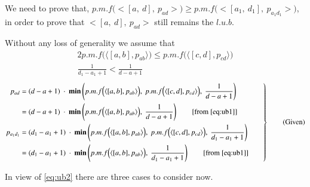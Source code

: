 \documentclass[final,3p, review, times]{Elsevier/elsarticle}
\begin{document}
We need to prove that, $p.m.f\Big(\big<[a,\ d],\ p_{ad}\big>\Big)\geq p.m.f\Big(\big<[a_1,\ d_1],\ p_{a_1d_1}\big>\Big)$, in order to prove that $\big<[a,\ d],\ p_{ad}\big>$ still remains the $l.u.b$.

Without any loss of generality we assume that
\begin{alignat}{2}
p.m.f\Big(\langle[a,b],p_{ab}\rangle\Big)\leq p.m.f\Big(\langle[c,d],p_{cd}\rangle\Big)\label{eq:ub1}\\
\frac{1}{d_1-a_1+1}<\frac{1}{d-a+1}\label{eq:ub2}
\end{alignat}
\begin{equation*}
 \left.\begin{aligned}
        p_{ad}&=(d-a+1)\ \cdot\ \mathbf{min}\left(p.m.f\Big(\langle[a,b],p_{ab}\rangle\Big),\ p.m.f\Big(\langle[c,d],p_{cd}\rangle\Big),\ \frac{1}{d-a+1}\right)\\
        &=(d-a+1)\ \cdot\ \mathbf{min}\left(p.m.f\Big(\langle[a,b],p_{ab}\rangle\Big),\ \frac{1}{d-a+1}\right)\qquad[\mathrm{from}\ \ref{eq:ub1}]\\
        p_{a_1d_1}&=(d_1-a_1+1)\ \cdot\ \mathbf{min}\left(p.m.f\Big(\langle[a,b],p_{ab}\rangle\Big),\ p.m.f\Big(\langle[c,d],p_{cd}\rangle\Big),\ \frac{1}{d_1-a_1+1}\right)\\
        &=(d_1-a_1+1)\ \cdot\ \mathbf{min}\left(p.m.f\Big(\langle[a,b],p_{ab}\rangle\Big),\ \frac{1}{d_1-a_1+1}\right)\qquad[\mathrm{from}\ \ref{eq:ub1}]
       \end{aligned}\qquad
 \right\}
 \qquad \text{(Given)}
\end{equation*}

In view of \ref{eq:ub2} there are three cases to consider now.
\end{document}
